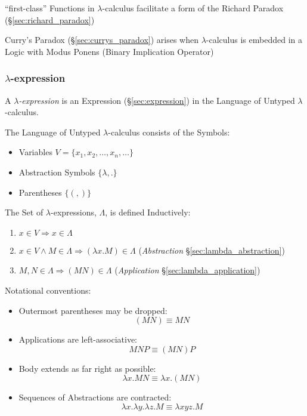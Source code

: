 ``first-class'' Functions in $\lambda$-calculus facilitate a form of
the Richard Paradox (\S\ref{sec:richard_paradox})

Curry's Paradox (\S\ref{sec:currys_paradox}) arises when
$\lambda$-calculus is embedded in a Logic with Modus Ponens (Binary
Implication Operator)



\subsubsection{$\lambda$-expression}\label{sec:lambda_expression}

A \emph{$\lambda$-expression} is an Expression
(\S\ref{sec:expression}) in the Language of Untyped
$\lambda$-calculus.

The Language of Untyped $\lambda$-calculus consists of the Symbols:
\begin{itemize}
  \item Variables $V = \{ x_1, x_2, \ldots, x_n, \ldots \}$
  \item Abstraction Symbols $\{ \lambda, . \}$
  \item Parentheses $\{ (, ) \}$
\end{itemize}

The Set of $\lambda$-expressions, $\Lambda$, is defined Inductively:
\begin{enumerate}
  \item $x \in V \Rightarrow x \in \Lambda$
  \item $x \in V \wedge M \in \Lambda \Rightarrow (\lambda x.M) \in
    \Lambda$ (\emph{Abstraction} \S\ref{sec:lambda_abstraction})
  \item $M,N \in \Lambda \Rightarrow (M N) \in \Lambda$
    (\emph{Application} \S\ref{sec:lambda_application})
\end{enumerate}
Notational conventions:
\begin{itemize}
  \item Outermost parentheses may be dropped:
    \[
      (M N) \equiv M N
    \]
  \item Applications are left-associative:
    \[
      M N P \equiv (M N) P
    \]
  \item Body extends as far right as possible:
    \[
      \lambda x.M N \equiv \lambda x.(M N)
    \]
  \item Sequences of Abstractions are contracted:
    \[
      \lambda x.\lambda y.\lambda z.M \equiv
      \lambda xyz.M
    \]
\end{itemize}


